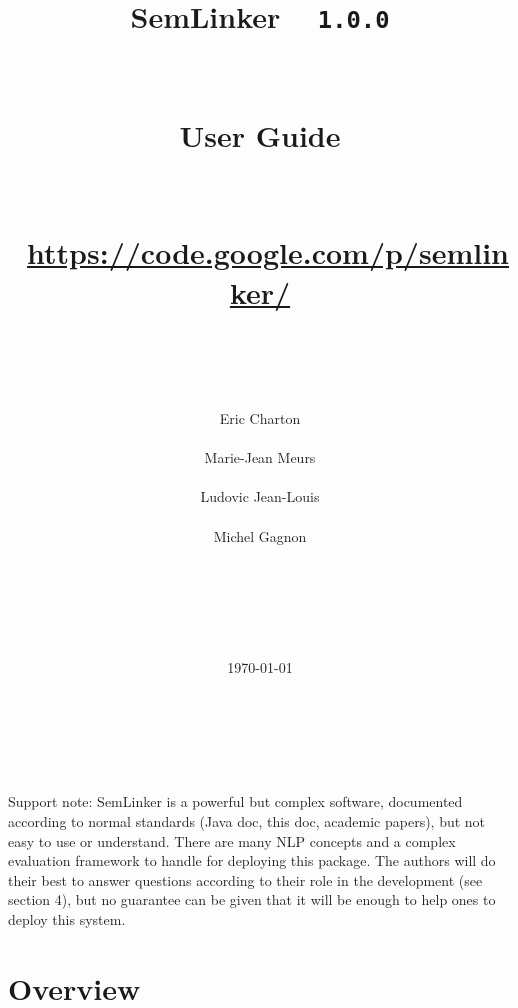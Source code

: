 \documentclass[11pt]{article}
\newcommand{\seml}{SemLinker}
\def\version{{\tt 1.0.0}}
\begin{document}
\title{\textbf{\seml{}} ~ \version \\~\\~\\User Guide\\~\\~\\~\url{https://code.google.com/p/semlinker/}\\~\\~}

\author{Eric Charton\\~\\Marie-Jean Meurs\\~\\Ludovic Jean-Louis\\~\\Michel Gagnon\\~\\~\\~\\~\\~}

\date{\mydate\today}

\maketitle


\thispagestyle{empty}
% 
\pagebreak
\tableofcontents

\thispagestyle{empty}

~\\~\\~\\
Support note: SemLinker is a powerful but complex software, documented according to normal standards (Java doc, this doc, academic papers), but not easy to use or understand. 
There are many NLP concepts and a complex evaluation framework to handle for deploying this package. 
The authors will do their best to answer questions according to their role in the development (see section 4), but no guarantee can be given that it will be enough to help ones to deploy this system.
\pagebreak

\section{Overview}
\label{sec:overwiew}
\end{document}
